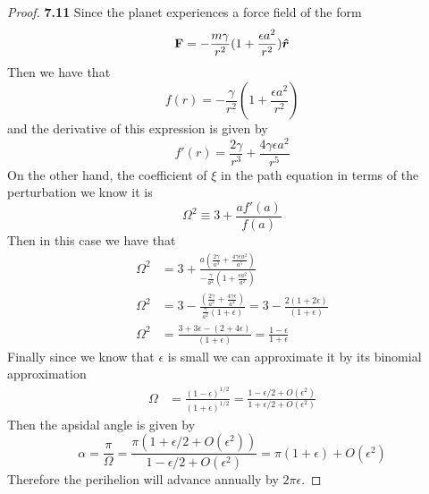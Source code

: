 \documentclass[11pt]{article}
\newcommand{\hatr}{\bm{\hat{r}}}
\theoremstyle{definition}
\begin{document}
	\begin{proof}{\textbf{7.11}}
        Since the planet experiences a force ﬁeld of the form
        $$\vectorbold{F} = - \frac{m\gamma}{r^2}(1 + \frac{\epsilon a^2}{r^2}) \hatr$$
        Then we have that
        $$f(r) = - \frac{\gamma}{r^2}(1 + \frac{\epsilon a^2}{r^2})$$
        and the derivative of this expression is given by
        $$f'(r) = \frac{2\gamma}{r^3} + \frac{4\gamma\epsilon a^2}{r^5}$$
        On the other hand, the coefficient of $\xi$ in the path equation in terms of the
        perturbation we know it is
        $$\Omega^2 \equiv 3 + \frac{af'(a)}{f(a)}$$
        Then in this case we have that
        \begin{align*}
            \Omega^2 &= 3 + \frac{a(\frac{2\gamma}{a^3} + \frac{4\gamma\epsilon a^2}{a^5})}
            {- \frac{\gamma}{a^2}(1 + \frac{\epsilon a^2}{a^2})} \\
            \Omega^2 &= 3 - \frac{(\frac{2\gamma}{a^2} + \frac{4\gamma\epsilon}{a^2})}
            {\frac{\gamma}{a^2}(1 + \epsilon)}
             =3 - \frac{2(1 + 2\epsilon)}{(1 + \epsilon)}\\
            \Omega^2 &= \frac{3+3\epsilon - (2 + 4\epsilon)}{(1 + \epsilon)}
            = \frac{1-\epsilon}{1 + \epsilon}
        \end{align*}
        Finally since we know that $\epsilon$ is small we can approximate it by its
        binomial approximation
        \begin{align*}
            \Omega &= \frac{(1-\epsilon)^{1/2}}{(1+\epsilon)^{1/2}}
            = \frac{1-\epsilon/2 + O(\epsilon^2)}{1+\epsilon/2 + O(\epsilon^2)}
        \end{align*}
        Then the apsidal angle is given by
        $$ \alpha = \frac{\pi}{\Omega} = \frac{\pi(1+\epsilon/2 + O(\epsilon^2))}{1-\epsilon/2 + O(\epsilon^2)} = 
        \pi(1 + \epsilon) + O(\epsilon^2)$$
        Therefore the perihelion will advance annually by $2\pi\epsilon$.
    \end{proof}
\end{document}
